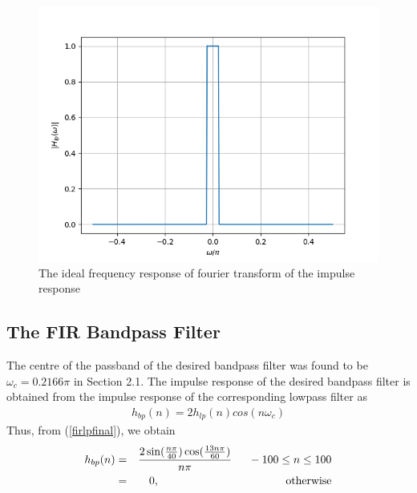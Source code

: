 \documentclass{article}
\begin{document}
\begin{figure}[H]
\includegraphics[width = \columnwidth]{figs/Hlp-ideal.png}
\caption{The ideal frequency response of fourier transform of the impulse response}
\label{fig8}
\end{figure}

\subsection{The FIR Bandpass Filter}
The centre of the passband of the desired bandpass filter was found to be $\omega_c = 0.2166\pi$ in Section
2.1.  The impulse response of the desired bandpass filter is obtained from the impulse response of the
corresponding lowpass filter as
\begin{eqnarray}
h_{bp}(n) = 2h_{lp}(n)cos(n\omega_c)
\end{eqnarray}
Thus, from (\ref{firlpfinal}), we obtain
\begin{eqnarray}
\label{firbpfinal}
h_{bp}(n) &=& \frac{2\sin(\frac{n\pi}{40}) \cos(\frac{13n\pi}{60})}{n\pi} \indent -100 \leq n \leq 100 \nonumber \\
&=& 0, \hspace{4cm} \mbox{otherwise}
\end{eqnarray}
\end{document}
